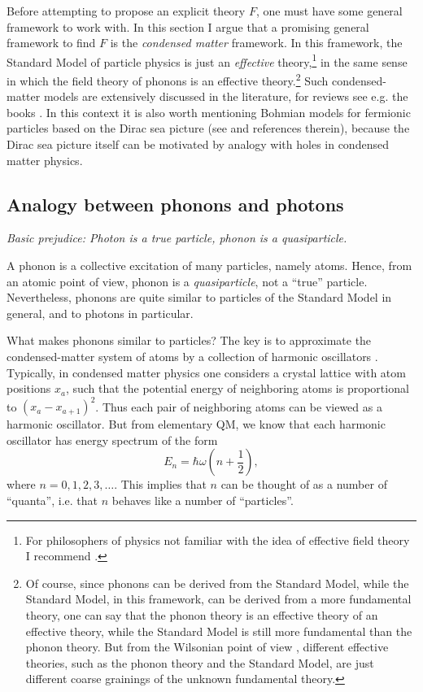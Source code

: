 \documentclass[12pt]{article}
\begin{document}
Before attempting to propose an explicit theory $F$, one must have some general framework to work with.
In this section I argue that a promising general framework to find $F$ is  
the {\em condensed matter} framework. 
In this framework, the Standard Model of particle physics is just an 
{\em effective} theory,\footnote{For philosophers of physics not familiar 
with the idea of effective field theory I recommend \cite{wallace}.} 
in the same sense in which the field theory of phonons is an effective theory.\footnote{Of course, 
since phonons can be derived from the Standard Model, while the Standard Model, in this framework, 
can be derived from a more fundamental theory, 
one can say that the phonon theory is an effective theory of an effective theory, while 
the Standard Model is still more fundamental than the phonon theory. 
But from the Wilsonian point of view \cite{wilson,peskin,huang,gifted_amateur,shankar,tong,ydri}, 
different effective theories, such as the phonon theory and the Standard Model, 
are just different coarse grainings of the unknown fundamental theory.}
Such condensed-matter models are extensively discussed in the literature, 
for reviews see e.g. the books \cite{volovik,wen}. 
%
In this context it is also worth mentioning Bohmian models for fermionic particles based on the 
Dirac sea picture (see \cite{colin-struyve} and references therein), because the Dirac sea picture 
itself can be motivated by analogy with holes in condensed matter physics.  


\subsection{Analogy between phonons and photons}

\begin{flushright}
{\it Basic prejudice: Photon is a true particle, phonon is a quasiparticle.} 
\end{flushright}

A phonon is a collective excitation of many particles, namely atoms. 
Hence, from an atomic point of view, phonon is a {\em quasiparticle}, 
not a ``true'' particle. Nevertheless, phonons are quite similar to particles 
of the Standard Model in general, and to photons in particular. 

What makes phonons similar to particles?
The key is to approximate the condensed-matter system of atoms by a collection of harmonic oscillators
\cite{kittel,simons,gifted_amateur}. 
Typically, in condensed matter physics one considers a crystal lattice with atom positions $x_a$, 
such that the potential energy of neighboring atoms is proportional to $(x_a-x_{a+1})^2$.
Thus each pair of neighboring atoms can be viewed as a harmonic oscillator.
But from elementary QM, we know that each harmonic oscillator has energy spectrum of the form
\begin{equation}
E_n=\hbar\omega \left(n+\frac{1}{2}\right),  
\end{equation}
where $n=0,1,2,3,\ldots$. This implies that
$n$ can be thought of as a number of ``quanta'', i.e. that 
$n$ behaves like a number of ``particles''.
\end{document}
